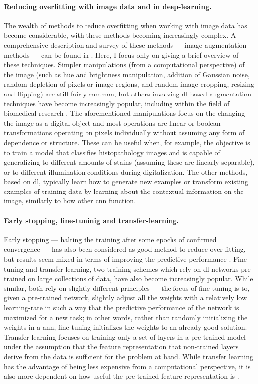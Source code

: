 \paragraph{Reducing overfitting with image data and in deep-learning.} The wealth of methods to reduce overfitting when working with image data has become considerable, with these methods becoming increasingly complex. A comprehensive description and survey of these methods --- image augmentation methods --- can be found in \cite{Shorten2019-hr}. Here, I focus only on giving a brief overview of these techniques. Simpler manipulations (from a computational perspective) of the image (such as hue and brightness manipulation, addition of Gaussian noise, random depletion of pixels or image regions, and random image cropping, resizing and flipping) are still fairly common, but others involving \ac{dl}-based augmentation techniques have become increasingly popular, including within the field of biomedical research \cite{Shorten2019-hr}. The aforementioned manipulations focus on the changing the image as a digital object and most operations are linear or boolean transformations operating on pixels individually without assuming any form of dependence or structure. These can be useful when, for example, the objective is to train a model that classifies histopathology images and is capable of generalizing to different amounts of stains (assuming these are linearly separable), or to different illumination conditions during digitalization. The other methods, based on \ac{dl}, typically learn how to generate new examples or transform existing examples of training data by learning about the contextual information on the image, similarly to how other \ac{cnn} function.

\paragraph{Early stopping, fine-tuninig and transfer-learning.} Early stopping --- halting the training after some epochs of confirmed convergence --- has also been considered as good method to reduce over-fitting, but results seem mixed in terms of improving the predictive performance \cite{Prechelt2012-xf}. Fine-tuning and transfer learning, two training schemes which rely on \ac{dl} networks pre-trained on large collections of data, have also become increasingly popular. While similar, both rely on slightly different principles --- the focus of fine-tuning is to, given a pre-trained network, slightly adjust all the weights with a relatively low learning-rate in such a way that the predictive performance of the network is maximized for a new task; in other words, rather than randomly initializing the weights in a \ac{ann}, fine-tuning initializes the weights to an already good solution. Transfer learning focuses on training only a set of layers in a pre-trained model under the assumption that the feature representation that non-trained layers derive from the data is sufficient for the problem at hand. While transfer learning has the advantage of being less expensive from a computational perspective, it is also more dependent on how useful the pre-trained feature representation is \cite{transfer-learning-fine-tuning}. 

